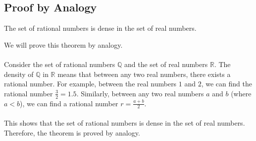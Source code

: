 \QED

\subsection{Proof by Analogy}

The set of rational numbers is dense in the set of real numbers.

We will prove this theorem by analogy.
\\\\	
Consider the set of rational numbers \( \mathbb{Q} \) and the set of real numbers \( \mathbb{R} \). The density of \( \mathbb{Q} \) in \( \mathbb{R} \) means that between any two real numbers, there exists a rational number.
For example, between the real numbers \( 1 \) and \( 2 \), we can find the rational number \( \frac{3}{2} = 1.5 \). Similarly, between any two real numbers \( a \) and \( b \) (where \( a < b \)), we can find a rational number \( r = \frac{a + b}{2} \).
\\\\
This shows that the set of rational numbers is dense in the set of real numbers.
Therefore, the theorem is proved by analogy.

\QED


